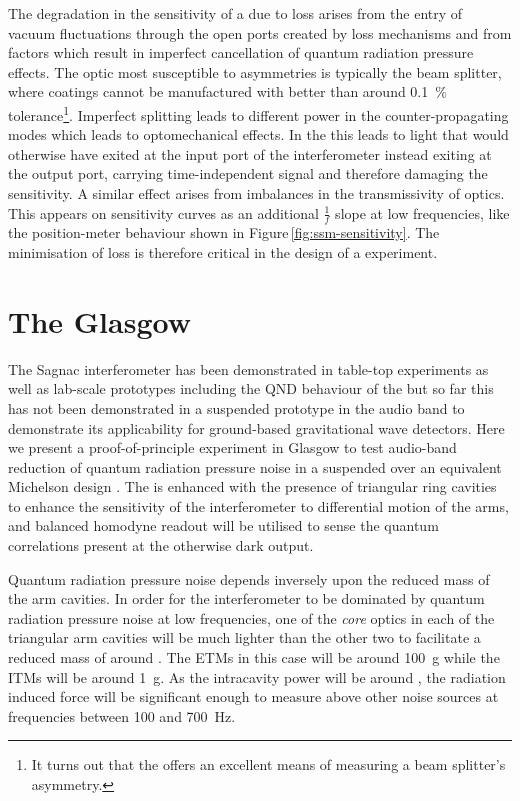 The degradation in the sensitivity of a \SSM{} due to loss arises from the entry of vacuum fluctuations through the open ports created by loss mechanisms and from factors which result in imperfect cancellation of quantum radiation pressure effects. The optic most susceptible to asymmetries is typically the beam splitter, where coatings cannot be manufactured with better than around \SI{0.1}{\percent} tolerance\footnote{It turns out that the \SSM{} offers an excellent means of measuring a beam splitter's asymmetry.}. Imperfect splitting leads to different power in the counter-propagating modes which leads to optomechanical effects. In the \SSM{} this leads to light that would otherwise have exited at the input port of the interferometer instead exiting at the output port, carrying time-independent signal and therefore damaging the sensitivity. A similar effect arises from imbalances in the transmissivity of optics. This appears on sensitivity curves as an additional $\frac{1}{f}$ slope at low frequencies, like the position-meter behaviour shown in Figure\,\ref{fig:ssm-sensitivity}. The minimisation of loss is therefore critical in the design of a \SSM{} experiment.

\section{The Glasgow \SSMEXPT{}}
The Sagnac interferometer has been demonstrated in table-top experiments \cite{Shaddock1998} as well as lab-scale prototypes \cite{Beyersdorf2002} including the \gls{QND} behaviour of the \SSM{} \cite{Eberle2010} but so far this has not been demonstrated in a suspended prototype in the audio band to demonstrate its applicability for ground-based gravitational wave detectors. Here we present a proof-of-principle experiment in Glasgow to test audio-band reduction of quantum radiation pressure noise in a suspended \SSM{} over an equivalent Michelson design \cite{Graef2014}. The \SSM{} is enhanced with the presence of triangular ring cavities to enhance the sensitivity of the interferometer to differential motion of the arms, and balanced homodyne readout will be utilised to sense the quantum correlations present at the otherwise dark output.

Quantum radiation pressure noise depends inversely upon the reduced mass of the arm cavities. In order for the interferometer to be dominated by quantum radiation pressure noise at low frequencies, one of the \emph{core} optics in each of the triangular arm cavities will be much lighter than the other two to facilitate a reduced mass of around . The \glspl{ETM} in this case will be around \SI{100}{\gram} while the \glspl{ITM} will be around \SI{1}{\gram}. As the intracavity power will be around , the radiation induced force will be significant enough to measure above other noise sources at frequencies between \num{100} and \SI{700}{\hertz}.

